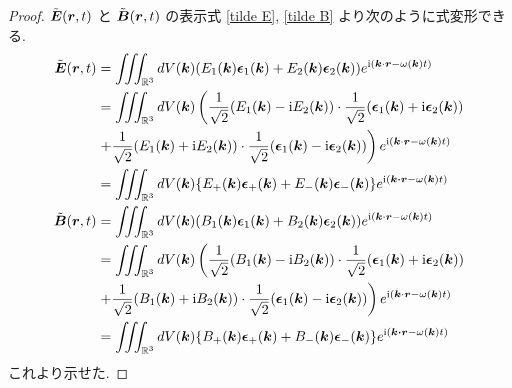\documentclass[a4paper,dvipdfmx]{jsarticle}
\theoremstyle{definition}
\begin{document}
\begin{proof}
  $\tilde{\vb*{E}}(\vb*{r}, t)$ と $\tilde{\vb*{B}}(\vb*{r}, t)$ の表示式 \eqref{tilde E}, \eqref{tilde B} より次のように式変形できる.
  \begin{align}
    \tilde{\EE}(\rr, t) & = \iiint_{\RR^3} dV(\kk)\qty(E_1(\kk)\ee_1(\kk) + E_2(\kk)\ee_2(\kk))e^{\ii(\kk\cdot\rr - \omega(\kk)t)}                                                  \\
                        & = \iiint_{\RR^3} dV(\kk)\left(\frac{1}{\sqrt{2}}\qty(E_1(\kk) - \ii E_2(\kk))\cdot\frac{1}{\sqrt{2}}\qty(\ee_1(\kk) + \ii\ee_2(\kk)) \right.              \\
                        & \left. + \frac{1}{\sqrt{2}}\qty(E_1(\kk) + \ii E_2(\kk))\cdot\frac{1}{\sqrt{2}}\qty(\ee_1(\kk) - \ii\ee_2(\kk))\right)e^{\ii(\kk\cdot\rr - \omega(\kk)t)} \\
                        & = \iiint_{\RR^3} dV(\kk)\qty{E_+(\kk)\ee_+(\kk) + E_-(\kk)\ee_-(\kk)}e^{\ii(\kk\vdot\rr - \omega(\kk)t)}                                                  \\
    \tilde{\BB}(\rr, t) & = \iiint_{\RR^3} dV(\kk)(B_1(\kk)\ee_1(\kk) + B_2(\kk)\ee_2(\kk))e^{\ii(\kk\cdot\rr - \omega(\kk)t)}                                                      \\
                        & = \iiint_{\RR^3} dV(\kk)\left(\frac{1}{\sqrt{2}}\qty(B_1(\kk) - \ii B_2(\kk))\cdot\frac{1}{\sqrt{2}}\qty(\ee_1(\kk) + \ii\ee_2(\kk)) \right.              \\
                        & \left. + \frac{1}{\sqrt{2}}\qty(B_1(\kk) + \ii B_2(\kk))\cdot\frac{1}{\sqrt{2}}\qty(\ee_1(\kk) - \ii\ee_2(\kk))\right)e^{\ii(\kk\cdot\rr - \omega(\kk)t)} \\
                        & = \iiint_{\RR^3} dV(\kk)\qty{B_+(\kk)\ee_+(\kk) + B_-(\kk)\ee_-(\kk)}e^{\ii(\kk\vdot\rr - \omega(\kk)t)}
  \end{align}
  これより示せた.
\end{proof}
\end{document}
